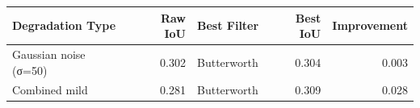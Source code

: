 \begin{tabular}{lrlrr}
\toprule
Degradation Type & Raw IoU & Best Filter & Best IoU & Improvement \\
\midrule
Gaussian noise (σ=50) & 0.302 & Butterworth & 0.304 & 0.003 \\
Combined mild & 0.281 & Butterworth & 0.309 & 0.028 \\
\bottomrule
\end{tabular}
